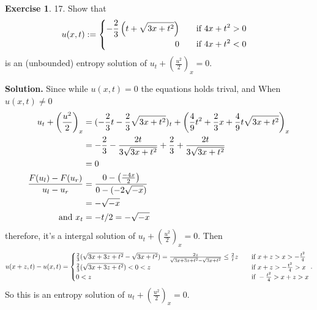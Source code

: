 \documentclass[a4paper]{book}
\newenvironment{solution}%
{\noindent\textbf{Solution.}}%
{\qedhere}
\numberwithin{equation}{chapter}
\theoremstyle{definition}
\newtheorem{exc}[exm]{Exercise}
\begin{document}
\begin{exc}
  17.  Show that
  \begin{equation*}
    u(x,t) :=
    \begin{cases}
      \begin{aligned}
      - \frac{2}{3}\left( t + \sqrt{3x + t^2} \right)& \qquad \textmd{if } 4x + t^2 > 0 \\
      0& \qquad \textmd{if } 4x + t^2 < 0
      \end{aligned}
    \end{cases}
  \end{equation*}
  is an (unbounded) entropy solution of $u_t + (\frac{u^2}{2})_x = 0$.
\end{exc}

\begin{solution}
  Since while $u(x,t) = 0$ the equations holds trival, and When $u(x,t) \not= 0$ 
  \begin{align*}
    u_t + \left( \frac{u^2}{2} \right)_x &= (-\frac{2}{3}t - \frac{2}{3}\sqrt{3x + t^2})_t + \left( \frac{4 }{9}t^2 + \frac{2}{3}x + \frac{4}{9}t\sqrt{3x + t^2} \right)_x \\
                                         &= - \frac{2}{3} - \frac{2t}{3\sqrt{3x + t^2}} + \frac{2}{3} + \frac{2t}{3\sqrt{3x + t^2}}\\
                                         &= 0 \\
    \frac{F(u_l) - F(u_r)}{u_l - u_r} &=\frac{0 - \left( \frac{-4x}{2} \right)}{0 - (-2\sqrt{-x})} \\
                                         &= -\sqrt{-x} \\
    \textmd{and } x_t &= -t/2 = -\sqrt{-x}
  \end{align*}
  therefore, it's a intergal solution of $u_t + (\frac{u^2}{2})_x = 0$. Then
  \begin{align*}
    u(x + z, t) - u(x,t) =
    \begin{cases}
      \frac{2}{3}(\sqrt{3x + 3z + t^2} - \sqrt{3x + t^2} ) =\frac{2z}{\sqrt{3x + 3z + t^2} - \sqrt{3x + t^2}} \leq \frac{2}{t}z \quad &\textmd{if } x+z > x > -\frac{t^2}{4}  \\
      \frac{2}{3}(\sqrt{3x + 3z + t^2}) < 0 < z \quad &\textmd{if } x+z > -\frac{t^2}{4} > x \\
      0 < z \quad &\textmd{if } -\frac{t^2}{4} > x+z > x
    \end{cases}.
  \end{align*}
  So this is an entropy solution of $u_t + (\frac{u^2}{2})_x = 0$.
\end{solution}
\end{document}

